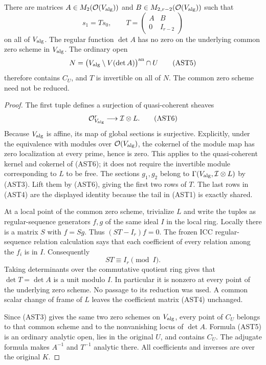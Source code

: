 \begin{lemma}
There are matrices $A\in M_2(\mathcal O(V_{\rm alg}))$ and
$B\in M_{2,r-2}(\mathcal O(V_{\rm alg}))$ such that
\[
 s_1=T s_0,\qquad
 T=\begin{pmatrix}A&B\\0&I_{r-2}\end{pmatrix}
 \tag{AST4}
\]
on all of $V_{\rm alg}$.  The regular function $\det A$ has no
zero on the underlying common zero scheme in $V_{\rm alg}$.
The ordinary open
\[
 N=\bigl(V_{\rm alg}\setminus V(\det A)\bigr)^{\rm an}\cap U
 \tag{AST5}
\]
therefore contains $C_U$, and $T$ is invertible on all of $N$.
The common zero scheme need not be reduced.
\end{lemma}

\begin{proof}
The first tuple defines a surjection of quasi-coherent sheaves
\[
             \mathcal O_{V_{\rm alg}}^r
                       \longrightarrow \mathcal I\otimes L.
 \tag{AST6}
\]
Because $V_{\rm alg}$ is affine, its map of global sections is
surjective.  Explicitly, under the equivalence with modules over
$\mathcal O(V_{\rm alg})$, the cokernel of the module map has
zero localization at every prime, hence is zero.  This applies
to the quasi-coherent kernel and cokernel of (AST6); it does not
require the invertible module corresponding to $L$ to be free.
The sections $g_1,g_2$ belong to
$\Gamma(V_{\rm alg},\mathcal I\otimes L)$ by (AST3).
Lift them by (AST6), giving the first two rows of $T$.
The last rows in (AST4) are the displayed identity because
the tail in (AST1) is exactly shared.

At a local point of the common zero scheme, trivialize $L$ and
write the tuples as regular-sequence generators $f,g$ of the
same ideal $I$ in the local ring.  Locally there is a matrix
$S$ with $f=Sg$.  Thus $(ST-I_r)f=0$.  The frozen ICC
regular-sequence relation calculation says that each coefficient
of every relation among the $f_i$ is in $I$.  Consequently
\[
                     ST\equiv I_r\pmod I.
 \tag{AST7}
\]
Taking determinants over the commutative quotient ring gives
that $\det T=\det A$ is a unit modulo $I$.  In particular
it is nonzero at every point of the underlying zero scheme.
No passage to its reduction was used.  A common scalar change
of frame of $L$ leaves the coefficient matrix (AST4) unchanged.

Since (AST3) gives the same two zero schemes on $V_{\rm alg}$,
every point of $C_U$ belongs to that common scheme and to the
nonvanishing locus of $\det A$.  Formula (AST5) is an ordinary
analytic open, lies in the original $U$, and contains $C_U$.
The adjugate formula makes $A^{-1}$ and $T^{-1}$ analytic there.
All coefficients and inverses are over the original $K$.
\end{proof}


